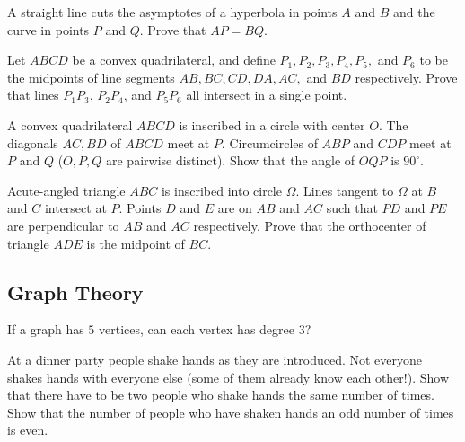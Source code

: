 \documentclass[12pt]{article}
\begin{document}
        \begin{exercise}
            A straight line cuts the asymptotes of a hyperbola in points $A$ and $B$ and the curve in points $P$ and $Q$. Prove that $AP = BQ$.   
        \end{exercise}

        \begin{exercise}
            Let $ABCD$ be a convex quadrilateral, and define $P_1, P_2, P_3, P_4, P_5,$ and $P_6$ to be the midpoints of line segments $AB, BC, CD, DA, AC,$ and $BD$ respectively. Prove that lines $P_{1}P_{3}$, $P_{2}P_{4}$, and $P_{5}P_{6}$ all intersect in a single point.
        \end{exercise}

        \begin{exercise}
            A convex quadrilateral $ABCD$ is inscribed in a circle with center $O$. The diagonals $AC, BD$ of $ABCD$ meet at $P$. Circumcircles of $ABP$ and $CDP$ meet at $P$ and $Q$ ($O, P, Q$ are pairwise distinct). Show that the angle of $OQP$ is $90^{\circ}$. 
        \end{exercise}

        \begin{exercise}
            Acute-angled triangle $ABC$ is inscribed into circle $\Omega$. Lines tangent to $\Omega$ at $B$ and $C$ intersect at $P$. Points $D$ and $E$ are on $AB$ and $AC$ such that $PD$ and $PE$ are perpendicular to $AB$ and $AC$ respectively. Prove that the orthocenter of triangle $ADE$ is the midpoint of $BC$.
        \end{exercise}

    \subsection{Graph Theory}

        \begin{exercise}
        If a graph has $5$ vertices, can each vertex has degree $3$? 
        \end{exercise}
        
        \begin{exercise}
        At a dinner party people shake hands as they are introduced. Not everyone shakes hands with everyone else (some of them already know each other!). Show that there have to be two people who shake hands the same number of times. Show that the number of people who have shaken hands an odd number of times is even.
        \end{exercise}
        
\end{document}
